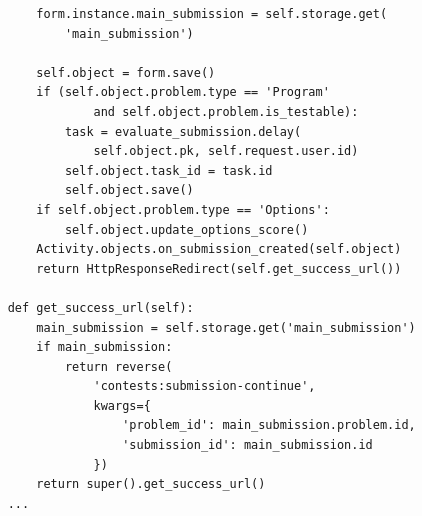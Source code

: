 \documentclass[a4paper]{article}
\begin{document}
\begin{enumerate}[wide, labelindent=0pt]
{\begin{verbatim}
        form.instance.main_submission = self.storage.get(
            'main_submission')

        self.object = form.save()
        if (self.object.problem.type == 'Program'
                and self.object.problem.is_testable):
            task = evaluate_submission.delay(
                self.object.pk, self.request.user.id)
            self.object.task_id = task.id
            self.object.save()
        if self.object.problem.type == 'Options':
            self.object.update_options_score()
        Activity.objects.on_submission_created(self.object)
        return HttpResponseRedirect(self.get_success_url())

    def get_success_url(self):
        main_submission = self.storage.get('main_submission')
        if main_submission:
            return reverse(
                'contests:submission-continue',
                kwargs={
                    'problem_id': main_submission.problem.id,
                    'submission_id': main_submission.id
                })
        return super().get_success_url()
    ...
    \end{verbatim}
}
\end{enumerate}
\end{document}
